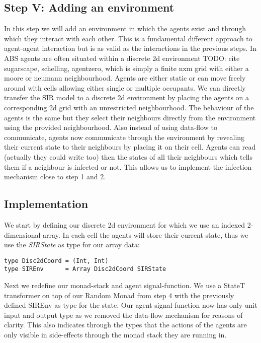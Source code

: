 \subsection{Step V: Adding an environment}
In this step we will add an environment in which the agents exist and through which they interact with each other. This is a fundamental different approach to agent-agent interaction but is as valid as the interactions in the previous steps.
In ABS agents are often situated within a discrete 2d environment TODO: cite sugarscape, schelling, agentzero, which is simply a finite nxm grid with either a moore or neumann neighbourhood. Agents are either static or can move freely around with cells allowing either single or multiple occupants. 
We can directly transfer the SIR model to a discrete 2d environment by placing the agents on a corresponding 2d grid with an unrestricted neighbourhood. The behaviour of the agents is the same but they select their neighbours directly from the environment using the provided neighbourhood. Also instead of using data-flow to communicate, agents now communicate through the environment by revealing their current state to their neighbours by placing it on their cell. Agents can read (actually they could write too) then the states of all their neighbours which tells them if a neighbour is infected or not. This allows us to implement the infection mechanism close to step 1 and 2.

\subsection{Implementation}
We start by defining our discrete 2d environment for which we use an indexed 2-dimensional array. In each cell the agents will store their current state, thus we use the \textit{SIRState} as type for our array data:

\begin{verbatim}
type Disc2dCoord = (Int, Int)
type SIREnv      = Array Disc2dCoord SIRState
\end{verbatim}

Next we redefine our monad-stack and agent signal-function. We use a StateT transformer on top of our Random Monad from step 4 with the previously defined SIREnv as type for the state. Our agent signal-function now has only unit input and output type as we removed the data-flow mechanism for reasons of clarity. This also indicates through the types that the actions of the agents are only visible in side-effects through the monad stack they are running in.


